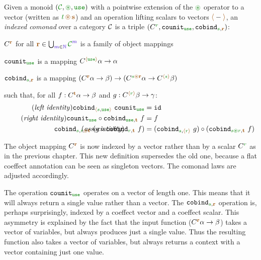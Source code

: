 \begin{definition}
Given a monoid $(\C, \cseq, \cunit)$ with a pointwise extension of the $\cseq$ operator to a vector
(written as $\cclrd{t}\,\aseq\,\aclrd{\textbf{s}}$) and an operation lifting scalars to vectors
$\alift{-}$, an \emph{indexed comonad} over a category $\mathcal{C}$ is a triple
$(\ctyp{\cclrd{r}{}}, \ident{counit}_{\cunit}, \ident{cobind}_{\cclrd{s}, \aclrd{\textbf{r}}})$:

\begin{compactitem}
\item $\ctyp{\aclrd{\textbf{r}}}{}$ for all $\aclrd{\textbf{r}} \in \bigcup_{\sclrd{m}\in \sclrd{\mathbb{N}}} \C^{\sclrd{m}}$ is a family of object mappings
\item $\ident{counit}_{\cunit}$ is a mapping $\ctyp{\alift{\cunit}}{\alpha} \rightarrow \alpha$
\item $\ident{cobind}_{\cclrd{s}, \aclrd{\textbf{r}}}$ is a mapping $(\ctyp{\aclrd{\textbf{r}}}{\alpha} \rightarrow \beta)
  \rightarrow (\ctyp{\cclrd{s}\aseq\aclrd{\textbf{r}}}{\alpha} \rightarrow \ctyp{\alift{\cclrd{s}}}{\beta})$
\end{compactitem}
such that, for all $f:\ctyp{\aclrd{\textbf{t}}}{\alpha} \rightarrow \beta$ and $g:\ctyp{\alift{\cclrd{r}}}{\beta} \rightarrow \gamma$:
\begin{align}
\tag{\emph{left identity}}
  \ident{cobind}_{\alift{\cclrd{s},\cunit}}~\ident{counit}_{\cunit} &= \idf{}
  \\
\tag{\emph{right identity}}
  \ident{counit}_{\cunit} \circ \ident{cobind}_{\cunit, \aclrd{\textbf{t}}}~f &= f
  \\
\tag{\emph{associativity}}
\hspace{-10em}
  \ident{cobind}_{\cclrd{s},\cclrd{r}\aseq\aclrd{\textbf{t}}}~(g \circ \ident{cobind}_{\cclrd{r}, \aclrd{\textbf{t}}}~f) &=
    (\ident{cobind}_{\cclrd{s}, \alift{\cclrd{r}}}~g) \circ (\ident{cobind}_{\cclrd{s}\cseq\cclrd{r},\aclrd{\textbf{t}}}~f)
\end{align}
\end{definition}

\noindent
The object mapping $\ctyp{\aclrd{\textbf{r}}}$ is now indexed by a vector rather than by a scalar
$\ctyp{\cclrd{r}}$ as in the previous chapter. This new definition supersedes the old one, because a
flat coeffect annotation can be seen as singleton vectors. The comonad laws are adjusted accordingly.

The operation $\ident{counit}_{\cunit}$ operates on a vector of length one. This means that it will always
return a single value rather than a vector. The $\ident{cobind}_{\cclrd{s}, \aclrd{\textbf{r}}}$
operation is, perhaps surprisingly, indexed by a coeffect vector and a coeffect scalar. This asymmetry
is explained by the fact that the input function ($\ctyp{\aclrd{\textbf{r}}}{\alpha} \rightarrow \beta$)
takes a vector of variables, but always produces just a single value. Thus the resulting function
also takes a vector of variables, but always returns a context with a vector containing just one value.

